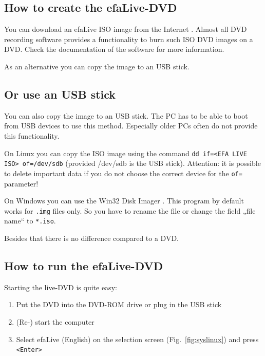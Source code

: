 \documentclass[a4paper,12pt,twoside]{article}
\begin{document}
\subsection{How to create the efaLive-DVD}
\label{sct:create_cd}
You can download an efaLive ISO image from the Internet \cite{EFA4}.
Almost all DVD recording software provides a functionality to burn such
ISO DVD images on a DVD. Check the documentation of the software for more
information.

As an alternative you can copy the image to an USB stick.

\subsection{Or use an USB stick}
\label{sct:usb_stick}
You can also copy the image to an USB stick. The
PC has to be able to boot from USB devices to use this method.
Especially older PCs often do not provide this functionality.

On Linux you can copy the ISO image using the command \texttt{dd
if={\textless}EFA LIVE ISO{\textgreater} of=/dev/sdb}
(provided /dev/sdb is the USB stick). Attention: it is possible to
delete important data if you do not choose the correct device for the
\texttt{of=} parameter!

On Windows you can use the Win32 Disk Imager \cite{IMG1}. This program by
default works for \texttt{.img} files only. So you
have to rename the file or change the field „file name“ to
\texttt{*.iso}.

Besides that there is no difference compared to a DVD.


\subsection{How to run the efaLive-DVD}
\label{sct:live_run}
Starting the live-DVD is quite easy:

\begin{enumerate}
    \item Put the DVD into the DVD-ROM drive or plug in the USB stick
    \item (Re-) start the computer
    \item Select efaLive (English) on the selection screen
        (Fig.~\ref{fig:syslinux}) and press \texttt{{\textless}Enter{\textgreater}}
\end{enumerate}
\end{document}
